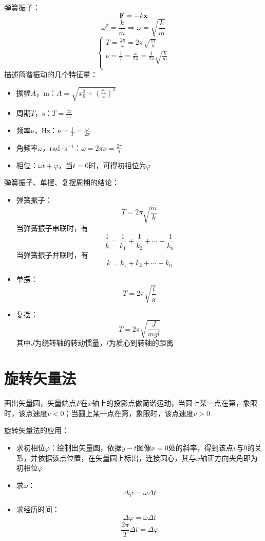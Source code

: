 \documentclass[12pt, a4paper, twoside]{ctexbook}
\begin{document}
{\sonti 弹簧振子}：
$$
\boldsymbol{F}=-k\boldsymbol{x}
$$
$$
\omega^2=\frac{k}{m} \Rightarrow \omega=\sqrt{\frac{k}{m}}
$$
$$
\left\{ \begin{array}{l}
	T=\frac{2\pi}{\omega}=2\pi \sqrt{\frac{m}{k}}\\
	\nu =\frac{1}{T}=\frac{\omega}{2\pi}=\frac{1}{2\pi}\sqrt{\frac{k}{m}}\\
\end{array} \right. 
$$
\newpage
{\sonti 描述简谐振动的几个特征量}：
\begin{itemize}
    \item 振幅$A$，$\mathrm{m}$：$A=\sqrt{x_0^2+\left(\frac{v_0}{\omega}\right)^2}$
    \item 周期$T$，$\mathrm{s}$：$T=\frac{2\pi}{\omega}$
    \item 频率$\nu$，$\mathrm{Hz}$：$\nu=\frac{1}{T}=\frac{\omega}{2\pi}$
    \item 角频率$\omega$，$\mathrm{rad}\cdot\mathrm{s}^{-1}$：$\omega=2\pi\nu=\frac{2\pi}{T}$
    \item 相位：$\omega t+\varphi$，当$t=0$时，可得初相位为$\varphi$
\end{itemize}

{\sonti 弹簧振子、单摆、复摆周期的结论}：
\begin{itemize}
    \item 弹簧振子：
    $$
    T=2\pi\sqrt{\frac{m}{k}}
    $$
    当弹簧振子串联时，有
    $$
    \frac{1}{k}=\frac{1}{k_1}+\frac{1}{k_2}+\cdots+\frac{1}{k_n}
    $$
    当弹簧振子并联时，有
    $$
    k=k_1+k_2+\cdots+k_n
    $$
    \item 单摆：
    $$
    T=2\pi\sqrt{\frac{l}{g}}
    $$
    \item 复摆：
    $$
    T=2\pi\sqrt{\frac{J}{mgl}}
    $$
    其中$J$为绕转轴的转动惯量，$l$为质心到转轴的距离
\end{itemize}
\section{旋转矢量法}
画出矢量圆，矢量端点$P$在$x$轴上的投影点做简谐运动，当圆上某一点在第\uppercase\expandafter{}，\uppercase\expandafter{}象限时，该点速度$v<0$；当圆上某一点在第\uppercase\expandafter{}，\uppercase\expandafter{}象限时，该点速度$v>0$

{\sonti 旋转矢量法的应用}：
\begin{itemize}
    \item 求初相位$\varphi$：绘制出矢量圆，依据$y-t$图像$x=0$处的斜率，得到该点$v$与$0$的关系，并依据该点位置，在矢量圆上标出，连接圆心，其与$x$轴正方向夹角即为初相位$\varphi$
    \item 求$\omega$：
    $$
    \Delta\varphi=\omega\Delta t
    $$
    \item 求经历时间：
    $$
    \Delta\varphi=\omega\Delta t
    $$
    $$
    \frac{2\pi}{T}\Delta t=\Delta\varphi
    $$
\end{itemize}
\end{document}
